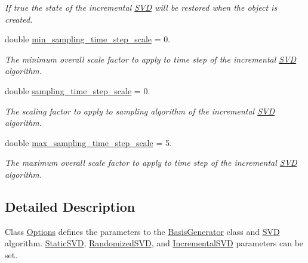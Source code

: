 \begin{DoxyCompactItemize}
\begin{DoxyCompactList}\small\item\em If true the state of the incremental \hyperlink{class_c_a_r_o_m_1_1_s_v_d}{S\-V\-D} will be restored when the object is created. \end{DoxyCompactList}\item 
\hypertarget{class_c_a_r_o_m_1_1_options_a771b334ea9813880d6bb0e681e01294e}{double \hyperlink{class_c_a_r_o_m_1_1_options_a771b334ea9813880d6bb0e681e01294e}{min\-\_\-sampling\-\_\-time\-\_\-step\-\_\-scale} = 0.}\label{class_c_a_r_o_m_1_1_options_a771b334ea9813880d6bb0e681e01294e}

\begin{DoxyCompactList}\small\item\em The minimum overall scale factor to apply to time step of the incremental \hyperlink{class_c_a_r_o_m_1_1_s_v_d}{S\-V\-D} algorithm. \end{DoxyCompactList}\item 
\hypertarget{class_c_a_r_o_m_1_1_options_afef7c7f57a29e4b56b3a5586ba6c7e45}{double \hyperlink{class_c_a_r_o_m_1_1_options_afef7c7f57a29e4b56b3a5586ba6c7e45}{sampling\-\_\-time\-\_\-step\-\_\-scale} = 0.}\label{class_c_a_r_o_m_1_1_options_afef7c7f57a29e4b56b3a5586ba6c7e45}

\begin{DoxyCompactList}\small\item\em The scaling factor to apply to sampling algorithm of the incremental \hyperlink{class_c_a_r_o_m_1_1_s_v_d}{S\-V\-D} algorithm. \end{DoxyCompactList}\item 
\hypertarget{class_c_a_r_o_m_1_1_options_a48c79ce92c45be923f431ec6d9c28b99}{double \hyperlink{class_c_a_r_o_m_1_1_options_a48c79ce92c45be923f431ec6d9c28b99}{max\-\_\-sampling\-\_\-time\-\_\-step\-\_\-scale} = 5.}\label{class_c_a_r_o_m_1_1_options_a48c79ce92c45be923f431ec6d9c28b99}

\begin{DoxyCompactList}\small\item\em The maximum overall scale factor to apply to time step of the incremental \hyperlink{class_c_a_r_o_m_1_1_s_v_d}{S\-V\-D} algorithm. \end{DoxyCompactList}\end{DoxyCompactItemize}


\subsection{Detailed Description}
Class \hyperlink{class_c_a_r_o_m_1_1_options}{Options} defines the parameters to the \hyperlink{class_c_a_r_o_m_1_1_basis_generator}{Basis\-Generator} class and \hyperlink{class_c_a_r_o_m_1_1_s_v_d}{S\-V\-D} algorithm. \hyperlink{class_c_a_r_o_m_1_1_static_s_v_d}{Static\-S\-V\-D}, \hyperlink{class_c_a_r_o_m_1_1_randomized_s_v_d}{Randomized\-S\-V\-D}, and \hyperlink{class_c_a_r_o_m_1_1_incremental_s_v_d}{Incremental\-S\-V\-D} parameters can be set. 

